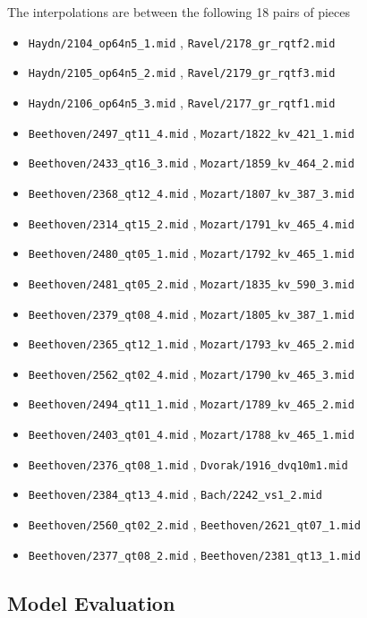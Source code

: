 \documentclass[sigconf,authorversion]{acmart}
\providecommand{\tightlist}{%
  \setlength{\itemsep}{0pt}\setlength{\parskip}{0pt}}
\begin{document}
The interpolations are between the following 18 pairs of pieces

\begin{itemize}
\tightlist
\item \texttt{Haydn/2104\_op64n5\_1.mid} , \texttt{Ravel/2178\_gr\_rqtf2.mid}
\item \texttt{Haydn/2105\_op64n5\_2.mid} ,   \texttt{Ravel/2179\_gr\_rqtf3.mid}
\item \texttt{Haydn/2106\_op64n5\_3.mid} ,   \texttt{Ravel/2177\_gr\_rqtf1.mid}
\item \texttt{Beethoven/2497\_qt11\_4.mid} , \texttt{Mozart/1822\_kv\_421\_1.mid}
\item \texttt{Beethoven/2433\_qt16\_3.mid} , \texttt{Mozart/1859\_kv\_464\_2.mid}
\item \texttt{Beethoven/2368\_qt12\_4.mid} , \texttt{Mozart/1807\_kv\_387\_3.mid}
\item \texttt{Beethoven/2314\_qt15\_2.mid} , \texttt{Mozart/1791\_kv\_465\_4.mid}
\item \texttt{Beethoven/2480\_qt05\_1.mid} , \texttt{Mozart/1792\_kv\_465\_1.mid}
\item \texttt{Beethoven/2481\_qt05\_2.mid} , \texttt{Mozart/1835\_kv\_590\_3.mid}
\item \texttt{Beethoven/2379\_qt08\_4.mid} , \texttt{Mozart/1805\_kv\_387\_1.mid}
\item \texttt{Beethoven/2365\_qt12\_1.mid} , \texttt{Mozart/1793\_kv\_465\_2.mid}
\item \texttt{Beethoven/2562\_qt02\_4.mid} , \texttt{Mozart/1790\_kv\_465\_3.mid}
\item \texttt{Beethoven/2494\_qt11\_1.mid} , \texttt{Mozart/1789\_kv\_465\_2.mid}
\item \texttt{Beethoven/2403\_qt01\_4.mid} , \texttt{Mozart/1788\_kv\_465\_1.mid}
\item \texttt{Beethoven/2376\_qt08\_1.mid} , \texttt{Dvorak/1916\_dvq10m1.mid}
\item \texttt{Beethoven/2384\_qt13\_4.mid} , \texttt{Bach/2242\_vs1\_2.mid}
\item \texttt{Beethoven/2560\_qt02\_2.mid} , \texttt{Beethoven/2621\_qt07\_1.mid}
\item \texttt{Beethoven/2377\_qt08\_2.mid} , \texttt{Beethoven/2381\_qt13\_1.mid}
\end{itemize}

\subsection{Model Evaluation}
\end{document}
